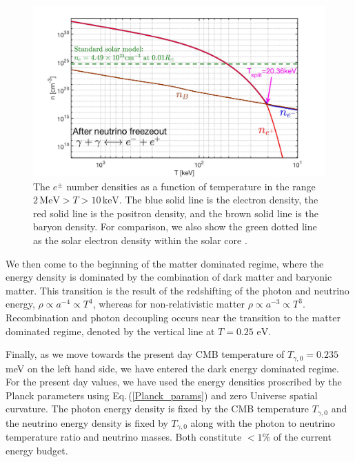 \documentclass[universe,article,submit,moreauthors,pdftex,a4paper]{Definitions/mdpi}
\newcommand{\eV}{\text{ eV}}
\newcommand{\req}[1]{Eq.\,(\ref{#1})}
\begin{document}
\begin{figure}[ht]
  \centering
  \includegraphics[width=\textwidth]{./plots/NewDensity_cm3.jpg}
  \caption{The $e^{\pm}$ number densities as a function of temperature in the range $2\,\mathrm{MeV}>T>10\,\mathrm{keV}$. The blue solid line is the electron density, the red solid line is the positron density, and the brown solid line is the baryon density. For comparison, we also show the green dotted line as the solar electron density within the solar core \cite{Bahcall:2000nu}.}
  \label{Density_fig} 
\end{figure}

We then come to the beginning of the matter dominated regime, where the energy density is dominated by the combination of dark matter and baryonic matter.  This transition is the result of the redshifting of the photon and neutrino energy, $\rho\propto a^{-4} \propto T^4$, whereas for non-relativistic matter $\rho\propto a^{-3}\propto T^3$.  Recombination and photon decoupling occurs near the transition to the matter dominated regime, denoted by the vertical line at $T=0.25\eV$.

Finally, as we move towards the present day CMB temperature of $T_{\gamma,0}=0.235$ meV on the left hand side, we have entered the dark energy dominated regime.  For the present day values, we have used the energy densities proscribed by the Planck parameters \cite{Planck:2013pxb} using \req{Planck_params} and zero Universe spatial curvature. The photon energy density is fixed by the CMB temperature $T_{\gamma,0}$ and the neutrino energy density is fixed by $T_{\gamma,0}$ along with the photon to neutrino temperature ratio and neutrino masses.  Both constitute $<1\%$ of the current energy budget.
\end{document}
